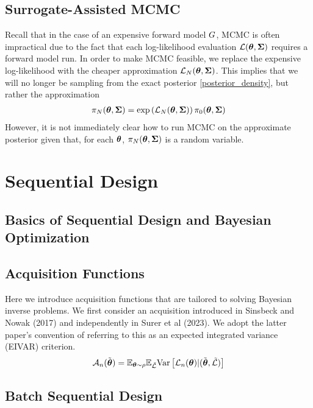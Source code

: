 \documentclass[12pt]{article}
\begin{document}
\subsection{Surrogate-Assisted MCMC}
Recall that in the case of an expensive forward model $G$, MCMC is often impractical due to the fact that each log-likelihood evaluation $\mathcal{L}(\boldsymbol{\theta}, \boldsymbol{\Sigma})$ requires a forward model 
 run. In order to make MCMC feasible, we replace the expensive log-likelihood with the cheaper approximation $\mathcal{L}_{N}(\boldsymbol{\theta}, \boldsymbol{\Sigma})$. This implies that we will no longer be 
 sampling from the exact posterior \ref{posterior_density}, but rather the approximation
 \begin{align}
 \pi_{N}(\boldsymbol{\theta}, \boldsymbol{\Sigma}) = \exp\left(\mathcal{L}_{N}(\boldsymbol{\theta}, \boldsymbol{\Sigma})\right)\pi_0(\boldsymbol{\theta}, \boldsymbol{\Sigma}) \label{approx_posterior_density}
 \end{align}
 However, it is not immediately clear how to run MCMC on the approximate posterior given that, for each $\boldsymbol{\theta}$,  $\pi_{N}(\boldsymbol{\theta}, \boldsymbol{\Sigma})$ is a random variable. 

\section{Sequential Design}

\subsection{Basics of Sequential Design and Bayesian Optimization}

\subsection{Acquisition Functions}
Here we introduce acquisition functions that are tailored to solving Bayesian inverse problems. We first consider an acquisition introduced in Sinsbeck and Nowak (2017) and independently 
in Surer et al (2023). We adopt the latter paper's convention of referring to this as an expected integrated variance (EIVAR) criterion. 
\begin{align}
\mathcal{A}_{n}(\tilde{\boldsymbol{\theta}}) = \mathbb{E}_{\boldsymbol{\theta} \sim \rho} \mathbb{E}_{\tilde{\mathcal{L}}} \mathrm{Var}\left[\mathcal{L}_{n}(\boldsymbol{\theta}) | (\tilde{\boldsymbol{\theta}}, \tilde{\mathcal{L}}) \right] \label{EIVAR}
\end{align}


\subsection{Batch Sequential Design}
\end{document}
